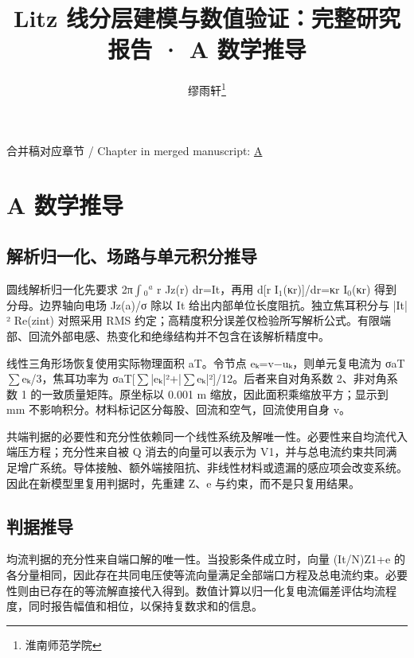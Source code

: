 \documentclass[journal,10pt]{IEEEtran}
\begin{document}
\title{Litz 线分层建模与数值验证：完整研究报告 · A 数学推导}
\author{缪雨轩\thanks{淮南师范学院}}

\maketitle
\noindent 合并稿对应章节 / Chapter in merged manuscript: \href{report_zh-CN_ieee.pdf#chapter-A}{A}\par
\FloatBarrier
\section*{A 数学推导}
\hypertarget{chapter-A}{}
\subsection*{解析归一化、场路与单元积分推导}
\hypertarget{A.report_derivation.heading}{}
圆线解析归一化先要求 2π\(\int\)\(_0\)\(^a\) r Jz(r) dr=It，再用 d[r I\(_1\)(κr)]/dr=κr I\(_0\)(κr) 得到分母。边界轴向电场 Jz(a)/σ 除以 It 给出内部单位长度阻抗。独立焦耳积分与 |It|² Re(zint) 对照采用 RMS 约定；高精度积分误差仅检验所写解析公式。有限端部、回流外部电感、热变化和绝缘结构并不包含在该解析精度中。


线性三角形场恢复使用实际物理面积 aT。令节点 eₖ=v−uₖ，则单元复电流为 σaT\(\sum\)eₖ/3，焦耳功率为 σaT[\(\sum\)|eₖ|²+|\(\sum\)eₖ|²]/12。后者来自对角系数 2、非对角系数 1 的一致质量矩阵。原坐标以 0.001 m 缩放，因此面积乘缩放平方；显示到 mm 不影响积分。材料标记区分每股、回流和空气，回流使用自身 v。


共端判据的必要性和充分性依赖同一个线性系统及解唯一性。必要性来自均流代入端压方程；充分性来自被 Q 消去的向量可以表示为 V1，并与总电流约束共同满足增广系统。导体接触、额外端接阻抗、非线性材料或遗漏的感应项会改变系统。因此在新模型里复用判据时，先重建 Z、e 与约束，而不是只复用结果。


\subsection*{判据推导}
\hypertarget{A.sharing_derivation.heading}{}
均流判据的充分性来自端口解的唯一性。当投影条件成立时，向量 (It/N)Z1+e 的各分量相同，因此存在共同电压使等流向量满足全部端口方程及总电流约束。必要性则由已存在的等流解直接代入得到。数值计算以归一化复电流偏差评估均流程度，同时报告幅值和相位，以保持复数求和的信息。
\end{document}
